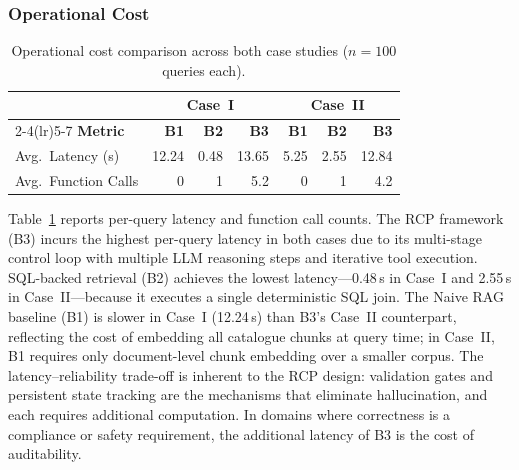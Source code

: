 \documentclass[largeformat]{interact}
\begin{document}

\subsubsection{Operational Cost}
\label{subsubsec:operational_cost}

\begin{table}[h]
    \centering
    \caption{Operational cost comparison across both case studies ($n = 100$ queries each).}
    \label{tab:operational_cost_combined}
    \small
    \setlength{\tabcolsep}{5pt}
    \renewcommand{\arraystretch}{1.1}
    \begin{tabular}{@{}lrrrrrr@{}}
        \toprule
        & \multicolumn{3}{c}{\textbf{Case~I}} & \multicolumn{3}{c}{\textbf{Case~II}} \\
        \cmidrule(lr){2-4}\cmidrule(lr){5-7}
        \textbf{Metric} & \textbf{B1} & \textbf{B2} & \textbf{B3} & \textbf{B1} & \textbf{B2} & \textbf{B3} \\
        \midrule
        Avg.\ Latency (s)    & 12.24 & 0.48  & 13.65 & 5.25  & 2.55  & 12.84 \\
        Avg.\ Function Calls & 0     & 1     & 5.2   & 0     & 1     & 4.2   \\
        \bottomrule
    \end{tabular}
\end{table}

Table~\ref{tab:operational_cost_combined} reports per-query latency and function call counts. The RCP framework (B3) incurs the highest per-query latency in both cases due to its multi-stage control loop with multiple LLM reasoning steps and iterative tool execution. SQL-backed retrieval (B2) achieves the lowest latency---0.48\,s in Case~I and 2.55\,s in Case~II---because it executes a single deterministic SQL join. The Naive RAG baseline (B1) is slower in Case~I (12.24\,s) than B3's Case~II counterpart, reflecting the cost of embedding all catalogue chunks at query time; in Case~II, B1 requires only document-level chunk embedding over a smaller corpus. The latency--reliability trade-off is inherent to the RCP design: validation gates and persistent state tracking are the mechanisms that eliminate hallucination, and each requires additional computation. In domains where correctness is a compliance or safety requirement, the additional latency of B3 is the cost of auditability.
\end{document}
